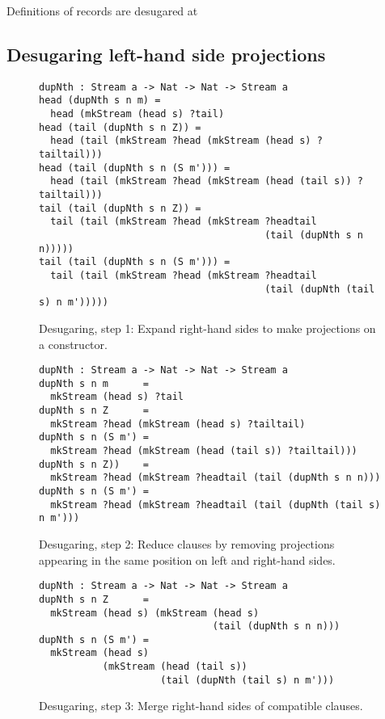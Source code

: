 Definitions of records are desugared at 

\subsection{Desugaring left-hand side projections}

\begin{figure}
\begin{lstlisting}[mathescape]
dupNth : Stream a -> Nat -> Nat -> Stream a
head (dupNth s n m) = 
  head (mkStream (head s) ?tail) 
head (tail (dupNth s n Z)) = 
  head (tail (mkStream ?head (mkStream (head s) ?tailtail)))
head (tail (dupNth s n (S m'))) = 
  head (tail (mkStream ?head (mkStream (head (tail s)) ?tailtail)))
tail (tail (dupNth s n Z)) = 
  tail (tail (mkStream ?head (mkStream ?headtail 
                                       (tail (dupNth s n n)))))
tail (tail (dupNth s n (S m'))) = 
  tail (tail (mkStream ?head (mkStream ?headtail 
                                       (tail (dupNth (tail s) n m')))))
\end{lstlisting}
\caption{Desugaring, step 1: Expand right-hand sides to make projections on a constructor.}
\label{fig:desugar_step1}
\end{figure}

\begin{figure}
\begin{lstlisting}[mathescape]
dupNth : Stream a -> Nat -> Nat -> Stream a
dupNth s n m      = 
  mkStream (head s) ?tail
dupNth s n Z      = 
  mkStream ?head (mkStream (head s) ?tailtail)
dupNth s n (S m') = 
  mkStream ?head (mkStream (head (tail s)) ?tailtail)))
dupNth s n Z))    = 
  mkStream ?head (mkStream ?headtail (tail (dupNth s n n)))
dupNth s n (S m') = 
  mkStream ?head (mkStream ?headtail (tail (dupNth (tail s) n m')))
\end{lstlisting}
\caption{Desugaring, step 2: Reduce clauses by removing projections appearing in the same position on left and right-hand sides.}
\label{fig:desugar_step1}
\end{figure}

\begin{figure}
\begin{lstlisting}[mathescape]
dupNth : Stream a -> Nat -> Nat -> Stream a
dupNth s n Z      = 
  mkStream (head s) (mkStream (head s) 
                              (tail (dupNth s n n)))
dupNth s n (S m') = 
  mkStream (head s) 
           (mkStream (head (tail s)) 
                     (tail (dupNth (tail s) n m')))
\end{lstlisting}
\caption{Desugaring, step 3: Merge right-hand sides of compatible clauses.}
\label{fig:desugar_step1}
\end{figure}


